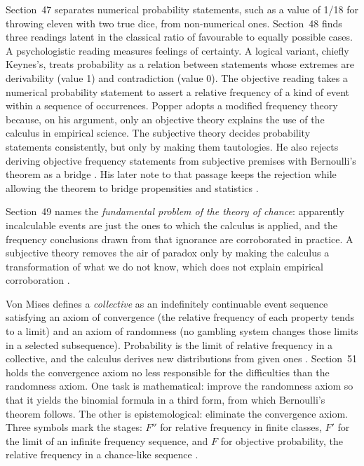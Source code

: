 Section~47 separates numerical probability statements, such as a value
of 1/18 for throwing eleven with two true dice, from non-numerical ones.
Section~48 finds three readings latent in the classical ratio of
favourable to equally possible cases. A psychologistic reading measures
feelings of certainty. A logical variant, chiefly Keynes's, treats
probability as a relation between statements whose extremes are
derivability (value 1) and contradiction (value 0). The objective
reading takes a numerical probability statement to assert a relative
frequency of a kind of event within a sequence of occurrences. Popper
adopts a modified frequency theory because, on his argument, only an
objective theory explains the use of the calculus in empirical science.
The subjective theory decides probability statements consistently, but
only by making them tautologies. He also rejects deriving objective
frequency statements from subjective premises with Bernoulli's theorem
as a bridge \parencite[\S\S47--48]{Popper2002LogicDiscoveryUI}.
His later note to that passage keeps the rejection while allowing the
theorem to bridge propensities and statistics
\parencite[\S48, note~6]{Popper2002LogicDiscoveryUI}.

Section~49 names the \emph{fundamental problem of the theory of chance}:
apparently incalculable events are just the ones to which the calculus
is applied, and the frequency conclusions drawn from that ignorance are
corroborated in practice. A subjective theory removes the air of paradox
only by making the calculus a transformation of what we do not know,
which does not explain empirical corroboration
\parencite[\S49]{Popper2002LogicDiscoveryUI}.

Von Mises defines a \emph{collective} as an indefinitely continuable
event sequence satisfying an axiom of convergence (the relative
frequency of each property tends to a limit) and an axiom of randomness
(no gambling system changes those limits in a selected subsequence).
Probability is the limit of relative frequency in a collective, and the
calculus derives new distributions from given ones
\parencite[\S50]{Popper2002LogicDiscoveryUI}.
Section~51 holds the convergence axiom no less responsible for the
difficulties than the randomness axiom. One task is mathematical: improve
the randomness axiom so that it yields the binomial formula in a third
form, from which Bernoulli's theorem follows. The other is epistemological:
eliminate the convergence axiom. Three symbols mark the stages: \(F''\)
for relative frequency in finite classes, \(F'\) for the limit of an
infinite frequency sequence, and \(F\) for objective probability, the
relative frequency in a chance-like sequence
\parencite[\S51]{Popper2002LogicDiscoveryUI}.

